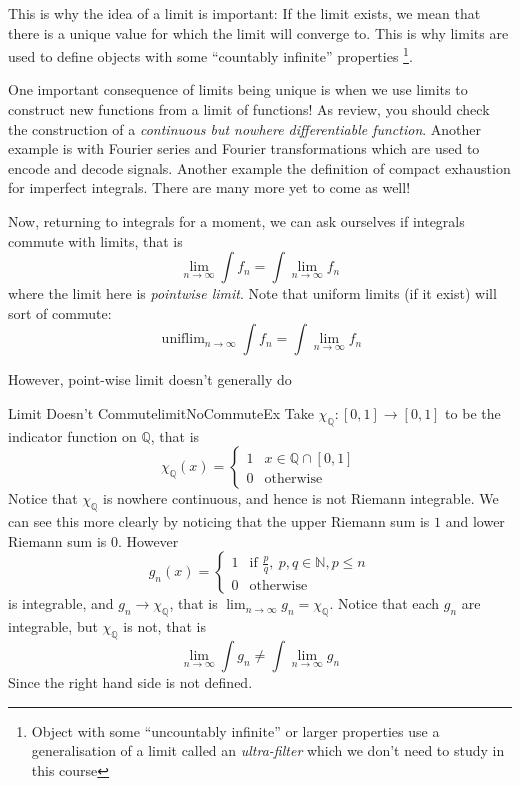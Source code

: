\documentclass[oneside]{book}
\newcommand{\N}{\mathbb{N}}
\newcommand{\Q}{\mathbb{Q}}
\newcommand{\uniflim}{\operatorname{unif lim}}
\newcommand{\rw}{\rightarrow}
\begin{document}
This is why the idea of a limit is important: If the limit exists, we mean that there is a unique value for which the limit
will converge to. This is why limits are used to define objects with some ``countably infinite'' properties
\footnote{Object with some ``uncountably infinite'' or larger properties use a generalisation of a limit called an
\emph{ultra-filter} which we don't need to study in this course}. 

One important consequence of limits being unique is when we use limits to construct new functions from a limit of
functions! As review, you should check the construction of a \emph{continuous but nowhere differentiable function}. Another
example is with Fourier series and Fourier transformations which are used to encode and decode signals. Another example
the definition of compact exhaustion for imperfect integrals. There are many more yet to come as well!

Now, returning to integrals for a moment, we can ask ourselves if integrals commute with limits, that is
\[
	\lim_{n \rw \infty} \int f_n = \int \lim_{n \rw \infty} f_n
\]
where the limit here is \emph{pointwise limit}. Note that uniform limits (if it exist) will sort of commute:
\[
	\uniflim_{n \rw \infty} \int f_n = \int \lim_{n \rw \infty} f_n
\]

However, point-wise limit doesn't generally do

\begin{example}{Limit Doesn't Commute}{limitNoCommuteEx}
	Take $\chi_\Q: [0,1]\rw [0,1]$ to be the indicator function on $\Q$, that is
	\[
		\chi_\Q(x) = \begin{cases}
			1 & x \in \Q\cap [0,1]\\
			0 & \text{otherwise}
		\end{cases}
	\]
	Notice that $\chi_\Q$ is nowhere continuous, and hence is not Riemann integrable. We can see this more clearly by
	noticing that the upper Riemann sum is $1$ and lower Riemann sum is $0$. However
	\[
		g_n(x) = \begin{cases}
			1 & \text{if } \frac{p}{q},\ p,q \in \N, p \le n\\
			0 & \text{otherwise}
		\end{cases}
	\]
	is integrable, and $g_n \rw \chi_\Q$, that is $\lim_{n \rw \infty} g_n = \chi_\Q$. Notice that each $g_n$ are
	integrable, but $\chi_\Q$ is not, that is
	\[
		\lim_{n \rw \infty} \int g_n \ne \int \lim_{n \rw \infty} g_n
	\]
	Since the right hand side is not defined. 
\end{example}
\end{document}
